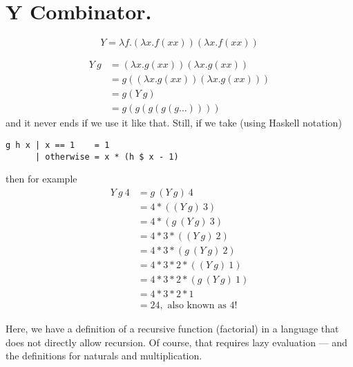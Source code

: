 
\section{ Y Combinator. }



$$
Y = λf.(λx.f(xx))(λx.f(xx))
$$

\begin{align*} 
Y\ g &= (λx.g(xx))(λx.g(xx)) \\
     &= g ((λx.g(xx)) (λx.g(xx))) \\
     &= g (Y\ g) \\
     &= g (g (g (g (g \ldots))))
\end{align*} 
and it never ends if we use it like that. Still, if we take (using Haskell notation)
\begin{verbatim}
g h x | x == 1    = 1
      | otherwise = x * (h $ x - 1)
\end{verbatim}
then for example 
\begin{align*} 
Y\ g\ 4 &= g\ (Y\ g)\ 4                \\
        &= 4 * ((Y\ g)\ 3)             \\
        &= 4 * (g\ (Y\ g)\ 3)          \\
        &= 4 * 3 * ((Y\ g)\ 2)         \\
        &= 4 * 3 * (g\ (Y\ g)\ 2)      \\
        &= 4 * 3 * 2 * ((Y\ g)\ 1)     \\
        &= 4 * 3 * 2 * (g\ (Y\ g)\ 1)  \\
        &= 4 * 3 * 2 * 1               \\
        &= 24,\text{ also known as } 4!
\end{align*} 

Here, we have a definition of a recursive function (factorial) in a language that does
not directly allow recursion. Of course, that requires lazy evaluation ---
and the definitions for naturals and multiplication.
